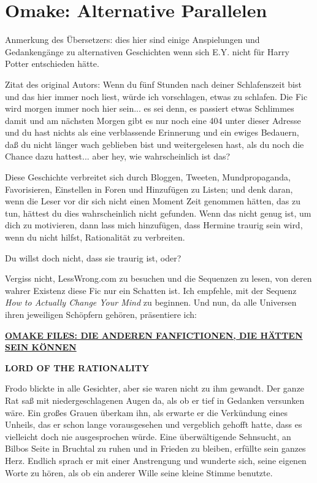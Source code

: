\chapter{Omake: Alternative Parallelen}

Anmerkung des Übersetzers: dies hier sind einige Anspielungen und Gedankengänge
zu alternativen Geschichten wenn sich E.Y. nicht für Harry Potter entschieden
hätte.

Zitat des original Autors: Wenn du fünf Stunden nach deiner Schlafenszeit bist
und das hier immer noch liest, würde ich vorschlagen, etwas zu schlafen. Die Fic
wird morgen immer noch hier sein... es sei denn, es passiert etwas Schlimmes
damit und am nächsten Morgen gibt es nur noch eine 404 unter dieser Adresse und
du hast nichts als eine verblassende Erinnerung und ein ewiges Bedauern, daß du
nicht länger wach geblieben bist und weitergelesen hast, als du noch die Chance
dazu hattest... aber hey, wie wahrscheinlich ist das?

Diese Geschichte verbreitet sich durch Bloggen, Tweeten, Mundpropaganda,
Favorisieren, Einstellen in Foren und Hinzufügen zu Listen; und denk daran, wenn
die Leser vor dir sich nicht einen Moment Zeit genommen hätten, das zu tun,
hättest du dies wahrscheinlich nicht gefunden. Wenn das nicht genug ist, um dich
zu motivieren, dann lass mich hinzufügen, dass Hermine traurig sein wird, wenn
du nicht hilfst, Rationalität zu verbreiten.

Du willst doch nicht, dass sie traurig ist, oder?

Vergiss nicht, LessWrong.com zu besuchen und die Sequenzen zu lesen, von deren
wahrer Existenz diese Fic nur ein Schatten ist. Ich empfehle, mit der Sequenz
\emph{How to Actually Change Your Mind} zu beginnen. Und nun, da alle Universen
ihren jeweiligen Schöpfern gehören, präsentiere ich:


\textbf{\underline{OMAKE FILES: DIE
ANDEREN FANFICTIONEN, DIE HÄTTEN SEIN KÖNNEN}}


\textbf{LORD OF THE RATIONALITY}

Frodo blickte in alle Gesichter, aber sie waren nicht zu ihm gewandt. Der ganze
Rat saß mit niedergeschlagenen Augen da, als ob er tief in Gedanken versunken
wäre. Ein großes Grauen überkam ihn, als erwarte er die Verkündung eines
Unheils, das er schon lange vorausgesehen und vergeblich gehofft hatte, dass es
vielleicht doch nie ausgesprochen würde. Eine überwältigende Sehnsucht, an
Bilbos Seite in Bruchtal zu ruhen und in Frieden zu bleiben, erfüllte sein
ganzes Herz. Endlich sprach er mit einer Anstrengung und wunderte sich, seine
eigenen Worte zu hören, als ob ein anderer Wille seine kleine Stimme benutzte.

